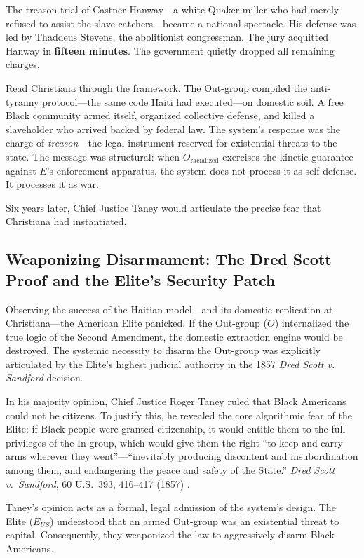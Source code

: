 The treason trial of Castner Hanway---a white Quaker miller who had merely refused to assist the slave catchers---became a national spectacle. His defense was led by Thaddeus Stevens, the abolitionist congressman. The jury acquitted Hanway in \textbf{fifteen minutes}. The government quietly dropped all remaining charges.

Read Christiana through the framework. The Out-group compiled the anti-tyranny protocol---the same code Haiti had executed---on domestic soil. A free Black community armed itself, organized collective defense, and killed a slaveholder who arrived backed by federal law. The system's response was the charge of \textit{treason}---the legal instrument reserved for existential threats to the state. The message was structural: when $O_{\text{racialized}}$ exercises the kinetic guarantee against $E$’s enforcement apparatus, the system does not process it as self-defense. It processes it as war.

Six years later, Chief Justice Taney would articulate the precise fear that Christiana had instantiated.

\subsection{Weaponizing Disarmament: The Dred Scott Proof and the Elite’s Security Patch}
Observing the success of the Haitian model---and its domestic replication at Christiana---the American Elite panicked. If the Out-group ($O$) internalized the true logic of the Second Amendment, the domestic extraction engine would be destroyed. The systemic necessity to disarm the Out-group was explicitly articulated by the Elite's highest judicial authority in the 1857 \textit{Dred Scott v. Sandford} decision.

In his majority opinion, Chief Justice Roger Taney ruled that Black Americans could not be citizens. To justify this, he revealed the core algorithmic fear of the Elite: if Black people were granted citizenship, it would entitle them to the full privileges of the In-group, which would give them the right ``to keep and carry arms wherever they went''---``inevitably producing discontent and insubordination among them, and endangering the peace and safety of the State.'' \textit{Dred Scott v.\ Sandford}, 60 U.S.\ 393, 416--417 (1857) \cite{dredscott}.

Taney’s opinion acts as a formal, legal admission of the system's design. The Elite ($E_{US}$) understood that an armed Out-group was an existential threat to capital. Consequently, they weaponized the law to aggressively disarm Black Americans.

